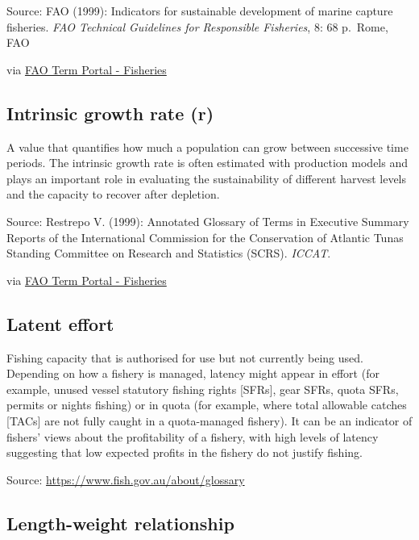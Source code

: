 \documentclass[
  11pt,
]{book}
\begin{document}
Source: FAO (1999): Indicators for sustainable development of marine capture fisheries. \emph{FAO Technical Guidelines for Responsible Fisheries}, 8: 68 p.~Rome, FAO

via \href{http://www.fao.org/fishery/glossary/en}{FAO Term Portal - Fisheries}

\hypertarget{intrinsic-growth-rate-r}{%
\subsection{Intrinsic growth rate (r)}\label{intrinsic-growth-rate-r}}

A value that quantifies how much a population can grow between successive time periods. The intrinsic growth rate is often estimated with production models and plays an important role in evaluating the sustainability of different harvest levels and the capacity to recover after depletion.

Source: Restrepo V. (1999): Annotated Glossary of Terms in Executive Summary Reports of the International Commission for the Conservation of Atlantic Tunas Standing Committee on Research and Statistics (SCRS). \emph{ICCAT}.

via \href{http://www.fao.org/fishery/glossary/en}{FAO Term Portal - Fisheries}

\hypertarget{latent-effort}{%
\subsection{Latent effort}\label{latent-effort}}

Fishing capacity that is authorised for use but not currently being used. Depending on how a fishery is managed, latency might appear in effort (for example, unused vessel statutory fishing rights {[}SFRs{]}, gear SFRs, quota SFRs, permits or nights fishing) or in quota (for example, where total allowable catches {[}TACs{]} are not fully caught in a quota-managed fishery). It can be an indicator of fishers' views about the profitability of a fishery, with high levels of latency suggesting that low expected profits in the fishery do not justify fishing.

Source: \url{https://www.fish.gov.au/about/glossary}

\hypertarget{length-weight-relationship}{%
\subsection{Length-weight relationship}\label{length-weight-relationship}}
\end{document}
